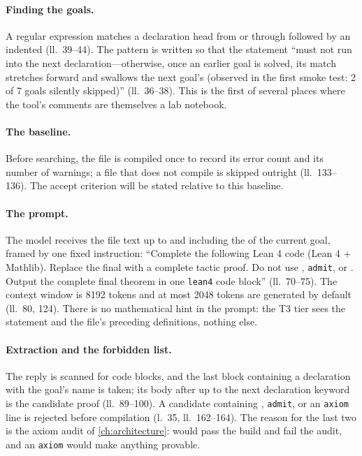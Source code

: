 \paragraph{Finding the goals.} A regular expression matches a declaration head from
 or  through  followed by an indented 
(ll.~39--44). The pattern is written so that the statement ``must not run into the next
declaration---otherwise, once an earlier goal is solved, its match stretches forward and
swallows the next goal's  (observed in the first smoke test: 2 of 7 goals
silently skipped)'' (ll.~36--38). This is the first of several places where the tool's
comments are themselves a lab notebook.

\paragraph{The baseline.} Before searching, the file is compiled once to record its error
count and its number of  warnings; a file that does not compile is skipped
outright (ll.~133--136). The accept criterion will be stated relative to this baseline.

\paragraph{The prompt.} The model receives the file text up to and including the
 of the current goal, framed by one fixed instruction: ``Complete the following
Lean 4 code (Lean 4 + Mathlib). Replace the final  with a complete tactic proof.
Do not use , \texttt{admit}, or . Output the complete final
theorem in one \texttt{lean4} code block'' (ll.~70--75). The context window is 8192 tokens
and at most 2048 tokens are generated by default (ll.~80, 124). There is no mathematical
hint in the prompt: the T3 tier sees the statement and the file's preceding definitions,
nothing else.

\paragraph{Extraction and the forbidden list.} The reply is scanned for code blocks, and the
last block containing a declaration with the goal's name is taken; its body after
 up to the next declaration keyword is the candidate proof (ll.~89--100). A
candidate containing , \texttt{admit},  or an \texttt{axiom}
line is rejected before compilation (l.~35, ll.~162--164). The reason for the last two is
the axiom audit of \cref{ch:architecture}:  would pass the build and
fail the audit, and an \texttt{axiom} would make anything provable.

